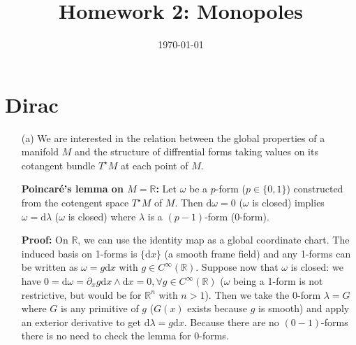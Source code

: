 \documentclass[10pt, a4paper]{article}
\title{Homework 2: Monopoles} %
\author{\PA} %
\date{\today} %
\begin{document}
\maketitlepage

\maketableofcontents


\footnotesize{

\section{Dirac}

\begin{enumerate}

  \item[(a)] We are interested in the relation between the global properties of a manifold $M$ and the structure of diffrential forms taking values on its cotangent bundle $T^\star M$ at each point of $M$.

  \textbf{Poincaré's lemma on $M = \mathbb{R}$:} Let $\omega$ be a $p$-form ($p \in \{0, 1\}$) constructed from the cotengent space $T^\star M$ of $M$. Then $\text{d}\omega = 0$ ($\omega$ is closed) implies $\omega = \text{d}\lambda$ ($\omega$ is closed) where $\lambda$ is a $(p-1)$-form ($0$-form).

  \textbf{Proof:} On $\mathbb{R}$, we can use the identity map as a global coordinate chart. The induced basis on 1-forms is $\{\text{d}x\}$ (a smooth frame field) and any 1-forms can be written as $\omega = g \text{d}x$ with $ g \in C^{\infty}(\mathbb{R})$. Suppose now that $\omega$ is closed: we have $0 = \text{d}\omega = \partial_x g \text{d}x \wedge \text{d}x = 0, \forall g \in C^{\infty}(\mathbb{R})$ ($\omega$ being a 1-form is not restrictive, but would be for $\mathbb{R}^n$ with $n>1$). Then we take the $0$-form $\lambda = G$ where $G$ is any primitive of $g$ ($G(x)$ exists because $g$ is smooth) and apply an exterior derivative to get $\text{d}\lambda = g \text{d}x$. Because there are no $(0-1)$-forms there is no need to check the lemma for $0$-forms. 


\end{enumerate}}
\end{document}
